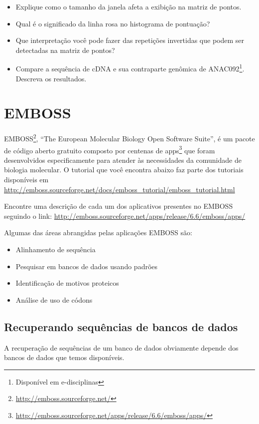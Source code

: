 \documentclass[letter,11pt]{book}
\begin{document}
{\color{red}
\begin{itemize}
\item Explique como o tamanho da janela afeta a exibição na matriz de pontos.
\item Qual é o significado da linha rosa no histograma de pontuação?
\item Que interpretação você pode fazer das repetições invertidas que podem ser detectadas na matriz de pontos?
\item Compare a sequência de cDNA e sua contraparte genômica de ANAC092\footnote{Disponível em e-disciplinas}. Descreva os resultados.
\end{itemize}
}

\chapter{EMBOSS}

EMBOSS\footnote{\url{http://emboss.sourceforge.net/}},  ``The European Molecular Biology Open Software Suite'', é um pacote de código aberto gratuito composto por centenas de apps\footnote{\url{http://emboss.sourceforge.net/apps/release/6.6/emboss/apps/}} que foram desenvolvidos especificamente para atender às necessidades da comunidade de biologia molecular. O tutorial que você encontra abaixo faz parte dos tutoriais disponíveis em \url{http://emboss.sourceforge.net/docs/emboss_tutorial/emboss_tutorial.html}

Encontre uma descrição de cada um dos aplicativos presentes no EMBOSS seguindo o link: \url{http://emboss.sourceforge.net/apps/release/6.6/emboss/apps/}

Algumas das áreas abrangidas pelas aplicações EMBOSS são:

\begin{itemize}
\item Alinhamento de sequência
\item Pesquisar em bancos de dados usando padrões
\item Identificação de motivos proteicos
\item Análise de uso de códons
\end{itemize}

\section{Recuperando sequências de bancos de dados}

A recuperação de sequências de um banco de dados obviamente depende dos bancos de dados que temos disponíveis.
\end{document}
